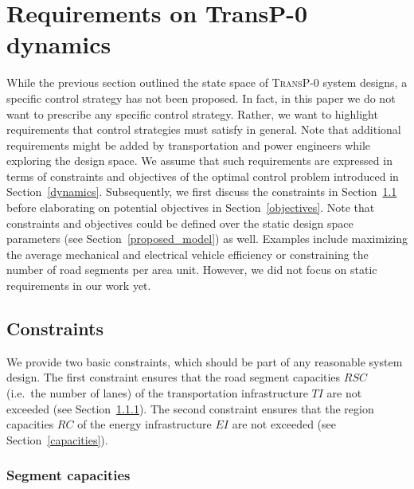\section{Requirements on \textbf{TransP-0} dynamics}
\label{requirements}

While the previous section outlined the state space of \textsc{TransP-0} system designs, a specific control strategy has not been proposed. In fact, in this paper we do not want to prescribe any specific control strategy. Rather, we want to highlight requirements that control strategies must satisfy in general. Note that additional requirements might be added by transportation and power engineers while exploring the design space. We assume that such requirements are expressed in terms of constraints and objectives of the optimal control problem introduced in Section~\ref{dynamics}. Subsequently, we first discuss the constraints in Section~\ref{constraints} before elaborating on potential objectives in Section~\ref{objectives}. Note that constraints and objectives could be defined over the static design space parameters (see Section~\ref{proposed_model}) as well. Examples include maximizing the average mechanical and electrical vehicle efficiency or constraining the number of road segments per area unit. However, we did not focus on static requirements in our work yet.

\subsection{Constraints}
\label{constraints}

We provide two basic constraints, which should be part of any reasonable system design. The first constraint ensures that the road segment capacities $RSC$ (i.e.\ the number of lanes) of the transportation infrastructure $TI$ are not exceeded (see Section~\ref{collisions}). The second constraint ensures that the region capacities $RC$ of the energy infrastructure $EI$ are not exceeded (see Section~\ref{capacities}).

\subsubsection{Segment capacities}
\label{collisions}

